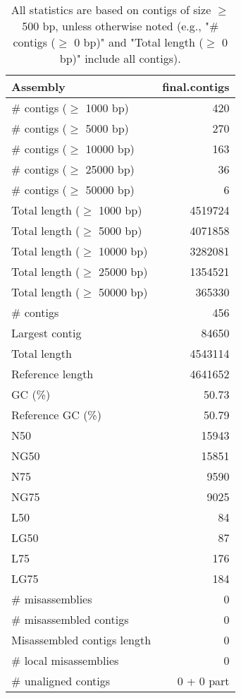 \documentclass[12pt,a4paper]{article}
\begin{document}
\begin{table}[ht]
\begin{center}
\caption{All statistics are based on contigs of size $\geq$ 500 bp, unless otherwise noted (e.g., "\# contigs ($\geq$ 0 bp)" and "Total length ($\geq$ 0 bp)" include all contigs).}
\begin{tabular}{|l*{1}{|r}|}
\hline
Assembly & final.contigs \\ \hline
\# contigs ($\geq$ 1000 bp) & 420 \\ \hline
\# contigs ($\geq$ 5000 bp) & 270 \\ \hline
\# contigs ($\geq$ 10000 bp) & 163 \\ \hline
\# contigs ($\geq$ 25000 bp) & 36 \\ \hline
\# contigs ($\geq$ 50000 bp) & 6 \\ \hline
Total length ($\geq$ 1000 bp) & 4519724 \\ \hline
Total length ($\geq$ 5000 bp) & 4071858 \\ \hline
Total length ($\geq$ 10000 bp) & 3282081 \\ \hline
Total length ($\geq$ 25000 bp) & 1354521 \\ \hline
Total length ($\geq$ 50000 bp) & 365330 \\ \hline
\# contigs & 456 \\ \hline
Largest contig & 84650 \\ \hline
Total length & 4543114 \\ \hline
Reference length & 4641652 \\ \hline
GC (\%) & 50.73 \\ \hline
Reference GC (\%) & 50.79 \\ \hline
N50 & 15943 \\ \hline
NG50 & 15851 \\ \hline
N75 & 9590 \\ \hline
NG75 & 9025 \\ \hline
L50 & 84 \\ \hline
LG50 & 87 \\ \hline
L75 & 176 \\ \hline
LG75 & 184 \\ \hline
\# misassemblies & 0 \\ \hline
\# misassembled contigs & 0 \\ \hline
Misassembled contigs length & 0 \\ \hline
\# local misassemblies & 0 \\ \hline
\# unaligned contigs & 0 + 0 part \\ \hline

\end{tabular}
\end{center}
\end{table}
\end{document}
